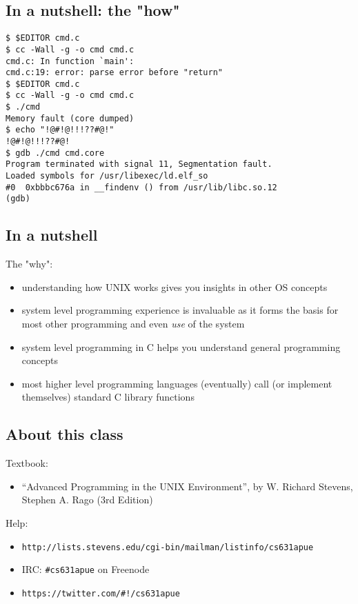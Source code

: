 \documentclass[xga]{xdvislides}
\begin{document}
\subsection{In a nutshell: the "how"}
\begin{verbatim}
$ $EDITOR cmd.c
$ cc -Wall -g -o cmd cmd.c
cmd.c: In function `main':
cmd.c:19: error: parse error before "return"
$ $EDITOR cmd.c
$ cc -Wall -g -o cmd cmd.c
$ ./cmd
Memory fault (core dumped)
$ echo "!@#!@!!!??#@!"
!@#!@!!!??#@!
$ gdb ./cmd cmd.core
Program terminated with signal 11, Segmentation fault.
Loaded symbols for /usr/libexec/ld.elf_so
#0  0xbbbc676a in __findenv () from /usr/lib/libc.so.12
(gdb)
\end{verbatim}

\subsection{In a nutshell}
The "why":
\begin{itemize}
	\item understanding how UNIX works gives you insights in other OS concepts
	\item system level programming experience is invaluable as it
		forms the basis for most other programming and even {\em
		use} of the system
	\item system level programming in C helps you understand general
		programming concepts
	\item most higher level programming languages (eventually) call
		(or implement themselves) standard C library functions
\end{itemize}

\subsection{About this class}
Textbook:
\begin{itemize}
	\item ``Advanced Programming in the UNIX Environment'', by
		W. Richard Stevens, Stephen A. Rago (3rd Edition)
\end{itemize}
\addvspace{.25in}
Help:
\begin{itemize}
	\item \verb+http://lists.stevens.edu/cgi-bin/mailman/listinfo/cs631apue+
	\item IRC: \verb+#cs631apue+ on Freenode
	\item \verb+https://twitter.com/#!/cs631apue+
\end{itemize}
\addvspace{.25in}
\end{document}
